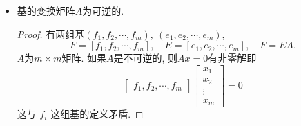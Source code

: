 \begin{itemize}
\begin{proof}
      根据基的定义, $(f_1,f_2,\cdots,f_n)$可以写成$e_1,e_2,\cdots,e_m$的线性组合.
      \begin{equation}
        \begin{matrix}
          f_1 = a_{11}e_1
          + \cdots a_{m1} e_m
          \\
          \vdots
          \\
          f_n = a_{1n}e_1
          + \cdots a_{mn} e_m
        \end{matrix}
      \end{equation}
      把上述过程写成矩阵乘法的形式
      \begin{equation}
        F = \begin{bmatrix} f_1, f_2, \cdots, f_n \end{bmatrix},\quad E = \begin{bmatrix} e_1, e_2, \cdots, e_m \end{bmatrix}
      \end{equation}
      并且
      \begin{equation}
        F = EA,
      \end{equation}
      其中$A = (a_{ij})$, $A$为一个$m \times n$的矩阵.
  
      考虑$Ax = 0$的解, 利用之前齐次线性方程组的解的性质, 参数个数为$(n-r)$, $r$为主元数目, 且$r \le m$.
      所以$Ax=0$一定有非$0$的解($m\neq n$).
  
      利用方程$F=EA$, 如果$Ax=0$有非零解, 那么
      \begin{equation}
        Fx=EAx = 0
      \end{equation}
      也有非零解, 和假设矛盾.
  \end{proof}

  \item 基的变换矩阵$A$为可逆的.
  \begin{proof}
      有两组基$(f_1,f_2,\cdots,f_m), \ (e_1,e_2,\cdots,e_m)$, 
      \begin{equation}
        F = [f_1,f_2,\cdots,f_m], \quad E = [e_1,e_2,\cdots,e_m], \quad F=EA.
      \end{equation}
      $A$为$m \times m$矩阵. 如果$A$是不可逆的, 则$Ax=0$有非零解即
      \begin{equation}
        \begin{bmatrix}
          f_1, f_2, \cdots, f_m
        \end{bmatrix}
        \begin{bmatrix}
          x_1\\
          x_2\\
          \vdots\\
          x_m
        \end{bmatrix}
        = 0
      \end{equation}
      这与 $f_i$ 这组基的定义矛盾.
  \end{proof}
\end{itemize}


